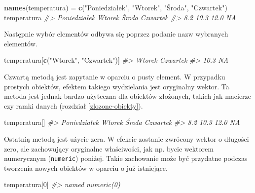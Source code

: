 \documentclass[paper=6in:9in,pagesize=pdftex,headinclude=on,footinclude=on,10pt]{scrbook}
\newenvironment{Shaded}{\begin{snugshade}}{\end{snugshade}}
\newcommand{\CommentTok}[1]{\textcolor[rgb]{0.56,0.35,0.01}{\textit{#1}}}
\newcommand{\DecValTok}[1]{\textcolor[rgb]{0.00,0.00,0.81}{#1}}
\newcommand{\KeywordTok}[1]{\textcolor[rgb]{0.13,0.29,0.53}{\textbf{#1}}}
\newcommand{\NormalTok}[1]{#1}
\newcommand{\StringTok}[1]{\textcolor[rgb]{0.31,0.60,0.02}{#1}}
\begin{document}
\begin{Shaded}
\begin{Highlighting}[]
\KeywordTok{names}\NormalTok{(temperatura) =}\StringTok{ }\KeywordTok{c}\NormalTok{(}\StringTok{"Poniedziałek"}\NormalTok{, }\StringTok{"Wtorek"}\NormalTok{, }\StringTok{"Środa"}\NormalTok{, }\StringTok{"Czwartek"}\NormalTok{)}
\NormalTok{temperatura}
\CommentTok{#> Poniedziałek       Wtorek        Środa     Czwartek }
\CommentTok{#>          8.2         10.3         12.0           NA}
\end{Highlighting}
\end{Shaded}

Następnie wybór elementów odbywa się poprzez podanie nazw wybranych elementów.

\begin{Shaded}
\begin{Highlighting}[]
\NormalTok{temperatura[}\KeywordTok{c}\NormalTok{(}\StringTok{"Wtorek"}\NormalTok{, }\StringTok{"Czwartek"}\NormalTok{)]}
\CommentTok{#>   Wtorek Czwartek }
\CommentTok{#>     10.3       NA}
\end{Highlighting}
\end{Shaded}

Czwartą metodą jest zapytanie w oparciu o pusty element.
W przypadku prostych obiektów, efektem takiego wydzielania jest oryginalny wektor.
Ta metoda jest jednak bardzo użyteczna dla obiektów złożonych, takich jak macierze czy ramki danych (rozdział \ref{zlozone-obiekty}).

\begin{Shaded}
\begin{Highlighting}[]
\NormalTok{temperatura[]}
\CommentTok{#> Poniedziałek       Wtorek        Środa     Czwartek }
\CommentTok{#>          8.2         10.3         12.0           NA}
\end{Highlighting}
\end{Shaded}

Ostatnią metodą jest użycie zera.
W efekcie zostanie zwrócony wektor o długości zero, ale zachowujący oryginalne właściwości, jak np. bycie wektorem numerycznym (\texttt{numeric}) poniżej.
Takie zachowanie może być przydatne podczas tworzenia nowych obiektów w oparciu o już istniejące.

\begin{Shaded}
\begin{Highlighting}[]
\NormalTok{temperatura[}\DecValTok{0}\NormalTok{]}
\CommentTok{#> named numeric(0)}
\end{Highlighting}
\end{Shaded}
\end{document}

